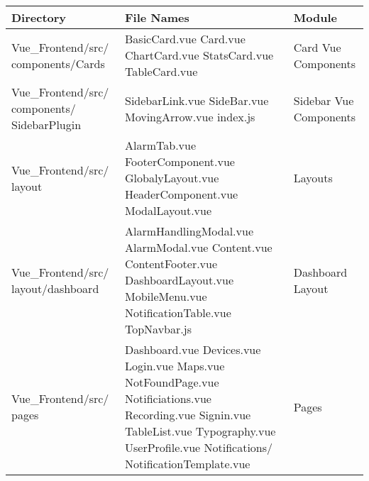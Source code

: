 \documentclass[conference]{IEEEtran}
\begin{document}
\begin{table}[H]
\centering
\renewcommand{\arraystretch}{1.5}
\begin{tabular}{|m{2.6cm}|m{3.5cm}|m{1.6cm}|}
\hline
\textbf{Directory} & \textbf{File Names} & \textbf{Module} \\ \hline

Vue\_Frontend/src/ components/Cards & 
BasicCard.vue \newline
Card.vue \newline
ChartCard.vue \newline
StatsCard.vue \newline
TableCard.vue & 
Card Vue Components\\ \hline

Vue\_Frontend/src/ components/ SidebarPlugin & 
SidebarLink.vue \newline
SideBar.vue \newline
MovingArrow.vue \newline
index.js & 
Sidebar Vue Components \\ \hline

Vue\_Frontend/src/ layout & 
AlarmTab.vue \newline
FooterComponent.vue \newline
GlobalyLayout.vue \newline
HeaderComponent.vue \newline
ModalLayout.vue & 
Layouts \\ \hline

Vue\_Frontend/src/ layout/dashboard & 
AlarmHandlingModal.vue \newline
AlarmModal.vue \newline
Content.vue \newline
ContentFooter.vue \newline
DashboardLayout.vue \newline
MobileMenu.vue \newline
NotificationTable.vue \newline
TopNavbar.js & 
Dashboard Layout \\ \hline

Vue\_Frontend/src/ pages & 
Dashboard.vue \newline
Devices.vue \newline
Login.vue \newline
Maps.vue \newline
NotFoundPage.vue \newline
Notificiations.vue \newline
Recording.vue \newline
Signin.vue \newline
TableList.vue \newline
Typography.vue \newline
UserProfile.vue  \newline
Notifications/ NotificationTemplate.vue &
Pages \\ \hline


\end{tabular}
\end{table}
\end{document}

